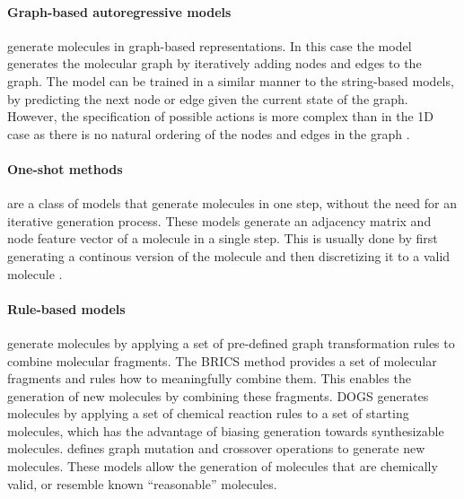 \paragraph{Graph-based autoregressive models} generate molecules in graph-based
representations. In this case the model generates the molecular graph by iteratively adding nodes
and edges to the graph. The model can be trained in a similar manner to the string-based models, by
predicting the next node or edge given the current state of the graph. However, the specification of
possible actions is more complex than in the 1D case as there is no natural ordering of the
nodes and edges in the graph \citep{cohen-karlikOvercomingOrderAutoregressive2024,youGraphConvolutionalPolicy2019}.

\paragraph{One-shot methods} are a class of models that generate molecules in one step, without the
need for an iterative generation process. These models generate an adjacency matrix and node feature
vector of a molecule in a single step. This is usually done by first generating a continous version
of the molecule and then discretizing it to a valid molecule \citep{decaoMolGANImplicitGenerative2018,madhawaGraphNVPInvertibleFlow2019,kadurinCornucopiaMeaningfulLeads2016}.

\paragraph{Rule-based models} generate molecules by applying a set of pre-defined graph transformation rules to
combine molecular fragments. The BRICS \citep{degenArtCompilingUsing2008} method provides a set of
molecular fragments and rules how to meaningfully combine them. This enables the generation of new
molecules by combining these fragments. DOGS \citep{hartenfellerDOGSReactionDrivenNovo2012}
generates molecules by applying a set of chemical reaction rules to a set of starting molecules,
which has the advantage of biasing generation towards synthesizable molecules.\@
\citet{jensenGraphbasedGeneticAlgorithm2019} defines graph mutation and crossover operations to
generate new molecules. These models allow the generation of molecules that are chemically valid, or
resemble known ``reasonable'' molecules.


